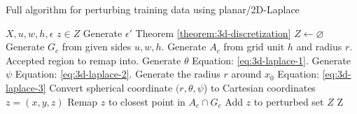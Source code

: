 \begin{algorithm}[H]
  \caption{Full algorithm for perturbing training data using planar/2D-Laplace \citep{DBLP:journals/corr/abs-1212-1984}}\label{alg:rq1}
  \begin{algorithmic}
    \Require $X, u, w, h, \epsilon$
    \Ensure $z \in Z$ 
    \State Generate $\epsilon'$ \Comment Theorem \ref{theorem:3d-discretization}
    \State $Z \gets \varnothing$ 
    \State Generate $G_c$ from given sides $u, w, h$.
    \State Generate $A_c$ from grid unit $h$ and radius $r$. \Comment Accepted region to remap into.
    \State Generate $\theta$      \Comment  Equation: \ref{eq:3d-laplace-1}.
    \State Generate  $\psi$     \Comment Equation: \ref{eq:3d-laplace-2}.
    \State Generate the radius $r$ around $x_0$          \Comment Equation: \ref{eq:3d-laplace-3}
    \State Convert spherical coordinate $(r, \theta, \psi$) to Cartesian coordinates $z = (x, y, z)$ 
        \State Remap $z$ to closest point in $A_c \cap G_c$ 
    \EndIf
    \State Add $z$ to perturbed set $Z$  
    \EndFor
    \State \Return Z
  \end{algorithmic}
  \label{alg:3d-laplace}
\end{algorithm}